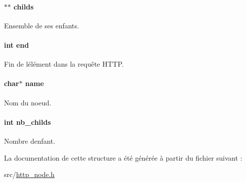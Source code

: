 \paragraph[{\texorpdfstring{childs}{childs}}]{$\ast$$\ast$ childs}\hypertarget{struct_h_t_t_p___node_ab6c4f7b695ae0ff1af4af91419340f98}{}\label{struct_h_t_t_p___node_ab6c4f7b695ae0ff1af4af91419340f98}
Ensemble de ses enfants. 
\paragraph[{\texorpdfstring{end}{end}}]{\setlength{\rightskip}{0pt plus 5cm}int end}\hypertarget{struct_h_t_t_p___node_abce9f5dc9c83f2639b72024fdee5d388}{}\label{struct_h_t_t_p___node_abce9f5dc9c83f2639b72024fdee5d388}
Fin de l\textquotesingle{}élément dans la requête H\+T\+TP. 
\paragraph[{\texorpdfstring{name}{name}}]{\setlength{\rightskip}{0pt plus 5cm}char$\ast$ name}\hypertarget{struct_h_t_t_p___node_a5ac083a645d964373f022d03df4849c8}{}\label{struct_h_t_t_p___node_a5ac083a645d964373f022d03df4849c8}
Nom du noeud. 
\paragraph[{\texorpdfstring{nb\+\_\+childs}{nb_childs}}]{\setlength{\rightskip}{0pt plus 5cm}int nb\+\_\+childs}\hypertarget{struct_h_t_t_p___node_a7ef173e87af6384077b245308271482d}{}\label{struct_h_t_t_p___node_a7ef173e87af6384077b245308271482d}
Nombre d\textquotesingle{}enfant. 

La documentation de cette structure a été générée à partir du fichier suivant \+:\begin{DoxyCompactItemize}
\item 
src/\hyperlink{http__node_8h}{http\+\_\+node.\+h}\end{DoxyCompactItemize}
